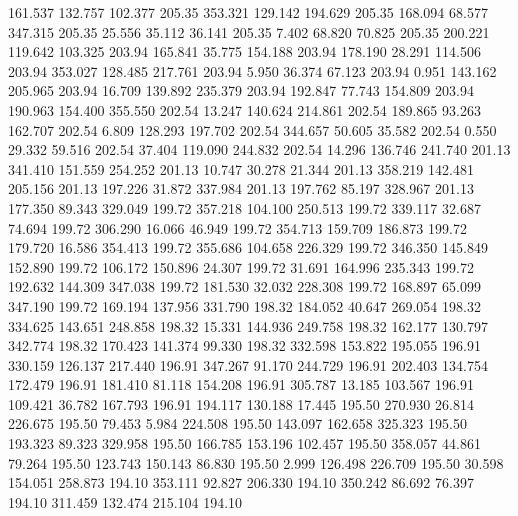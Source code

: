  161.537  132.757  102.377       205.35
 353.321  129.142  194.629       205.35
 168.094   68.577  347.315       205.35
  25.556   35.112   36.141       205.35
   7.402   68.820   70.825       205.35
 200.221  119.642  103.325       203.94
 165.841   35.775  154.188       203.94
 178.190   28.291  114.506       203.94
 353.027  128.485  217.761       203.94
   5.950   36.374   67.123       203.94
   0.951  143.162  205.965       203.94
  16.709  139.892  235.379       203.94
 192.847   77.743  154.809       203.94
 190.963  154.400  355.550       202.54
  13.247  140.624  214.861       202.54
 189.865   93.263  162.707       202.54
   6.809  128.293  197.702       202.54
 344.657   50.605   35.582       202.54
   0.550   29.332   59.516       202.54
  37.404  119.090  244.832       202.54
  14.296  136.746  241.740       201.13
 341.410  151.559  254.252       201.13
  10.747   30.278   21.344       201.13
 358.219  142.481  205.156       201.13
 197.226   31.872  337.984       201.13
 197.762   85.197  328.967       201.13
 177.350   89.343  329.049       199.72
 357.218  104.100  250.513       199.72
 339.117   32.687   74.694       199.72
 306.290   16.066   46.949       199.72
 354.713  159.709  186.873       199.72
 179.720   16.586  354.413       199.72
 355.686  104.658  226.329       199.72
 346.350  145.849  152.890       199.72
 106.172  150.896   24.307       199.72
  31.691  164.996  235.343       199.72
 192.632  144.309  347.038       199.72
 181.530   32.032  228.308       199.72
 168.897   65.099  347.190       199.72
 169.194  137.956  331.790       198.32
 184.052   40.647  269.054       198.32
 334.625  143.651  248.858       198.32
  15.331  144.936  249.758       198.32
 162.177  130.797  342.774       198.32
 170.423  141.374   99.330       198.32
 332.598  153.822  195.055       196.91
 330.159  126.137  217.440       196.91
 347.267   91.170  244.729       196.91
 202.403  134.754  172.479       196.91
 181.410   81.118  154.208       196.91
 305.787   13.185  103.567       196.91
 109.421   36.782  167.793       196.91
 194.117  130.188   17.445       195.50
 270.930   26.814  226.675       195.50
  79.453    5.984  224.508       195.50
 143.097  162.658  325.323       195.50
 193.323   89.323  329.958       195.50
 166.785  153.196  102.457       195.50
 358.057   44.861   79.264       195.50
 123.743  150.143   86.830       195.50
   2.999  126.498  226.709       195.50
  30.598  154.051  258.873       194.10
 353.111   92.827  206.330       194.10
 350.242   86.692   76.397       194.10
 311.459  132.474  215.104       194.10
